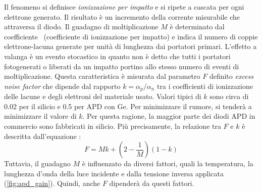 Il fenomeno si definisce \textit{ionizzazione per impatto} e si ripete a cascata per ogni elettrone generato. Il risultato è un incremento della corrente misurabile che attraversa il diodo. Il guadagno di moltiplicazione $M$ è determinato dal coefficiente \textalpha\ (coefficiente di ionizzazione per impatto) e indica il numero di coppie elettrone-lacuna generate per unità di lunghezza \cite{Jiang2019} dai portatori primari.
L'effetto a valanga è un evento stocastico in quanto non è detto che tutti i portatori fotogenerati o liberati da un impatto portino allo stesso numero di eventi di moltiplicazione. Questa caratteristica è misurata dal parametro $F$ definito \textit{excess noise factor} che dipende dal rapporto $k=\alpha_p / \alpha_n$ tra i coefficienti di ionizzazione delle lacune e degli elettroni del materiale usato. Valori tipici di $k$ sono circa di 0.02 per il silicio e 0.5 per APD con Ge. Per minimizzare il rumore, si tenderà a minimizzare il valore di $k$. Per questa ragione, la maggior parte dei diodi APD in commercio sono fabbricati in silicio. Più precisamente, la relazione tra $F$ e $k$ è descritta dall'equazione \cite{HAMAMATSU2021}\cite{Hossain2019}:
\begin{equation}
	F=Mk+(2-\frac{1}{M})(1-k)
\end{equation}
Tuttavia, il guadagno $M$ è influenzato da diversi fattori, quali la temperatura, la lunghezza d'onda della luce incidente e dalla tensione inversa applicata (\Fig\ref{fig:apd_gain}). Quindi, anche $F$ dipenderà da questi fattori. 
